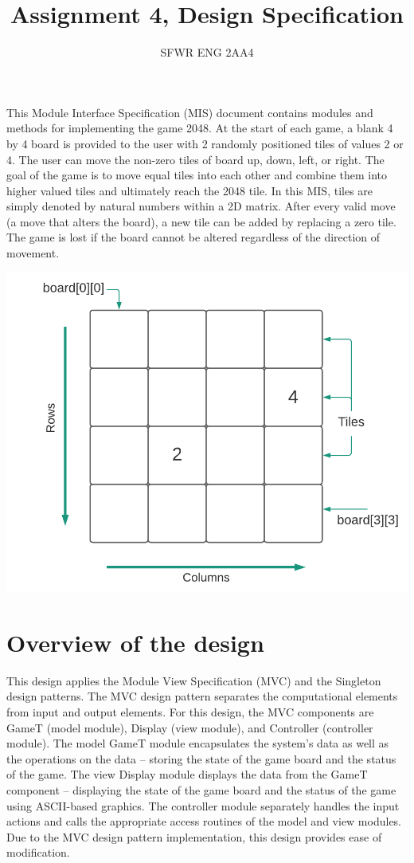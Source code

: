 \documentclass[12pt]{article}
\title{Assignment 4, Design Specification}
\author{SFWR ENG 2AA4}
\begin{document}
\maketitle

\indent This Module Interface Specification (MIS) document contains modules and methods for implementing the game 2048. At the start of each game, a blank 4 by 4 board is provided to the user with 2 randomly positioned tiles of values 2 or 4. The user can move the non-zero tiles of board up, down, left, or right. The goal of the game is to move equal tiles into each other and combine them into higher valued tiles and ultimately reach the 2048 tile. In this MIS, tiles are simply denoted by natural numbers within a 2D matrix. After every valid move (a move that alters the board), a new tile can be added by replacing a zero tile. The game is lost if the board cannot be altered regardless of the direction of movement. 

\begin{center}
\includegraphics[scale=0.7]{board.png}
\end{center}
\newpage
\section{Overview of the design}

\indent This design applies the Module View Specification (MVC) and the Singleton design patterns. The MVC design pattern separates the computational elements from input and output elements. For this design, the MVC components are GameT (model module), Display (view module), and Controller (controller module). The model GameT module encapsulates the system's data as well as the operations on the data – storing the state of the game board and the status of the game. The view Display module displays the data from the GameT component – displaying the state of the game board and the status of the game using ASCII-based graphics. The controller module separately handles the input actions and calls the appropriate access routines of the model and view modules. Due to the MVC design pattern implementation, this design provides ease of modification.\\
\end{document}
